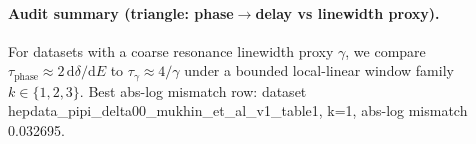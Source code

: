 \paragraph{Audit summary (triangle: phase$\to$delay vs linewidth proxy).} \AuditTag For datasets with a coarse resonance linewidth proxy $\gamma$, we compare $\tau_{\mathrm{phase}}\approx 2\,\mathrm{d}\delta/\mathrm{d}E$ to $\tau_\gamma\approx 4/\gamma$ under a bounded local-linear window family $k\in\{1,2,3\}$. Best abs-log mismatch row: dataset hepdata\_pipi\_delta00\_mukhin\_et\_al\_v1\_table1, k=1, abs-log mismatch 0.032695.